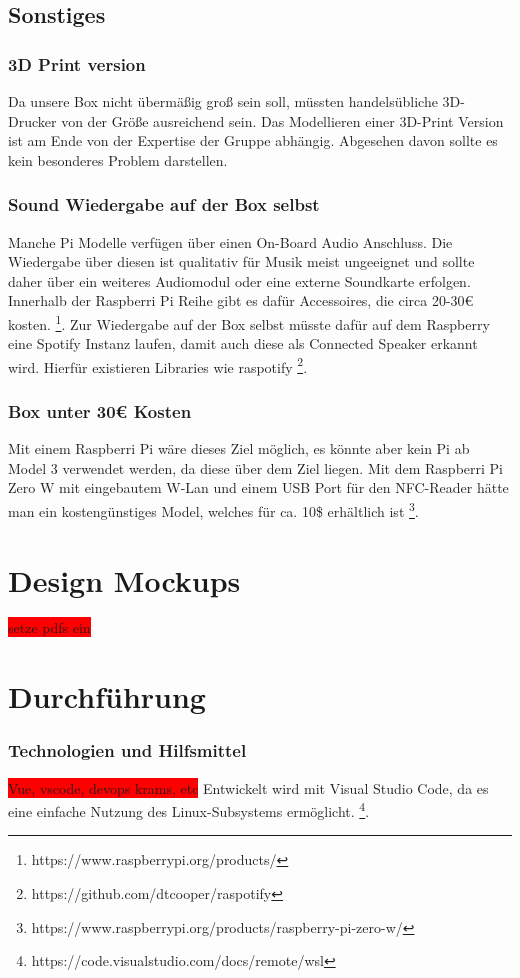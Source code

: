 \documentclass[10pt, a4paper, draft]{article}
\begin{document}
\subsection{Sonstiges}
\subsubsection{3D Print version}
Da unsere Box nicht übermäßig groß sein soll, müssten handelsübliche 3D-Drucker von der Größe ausreichend sein. Das Modellieren einer 3D-Print Version ist am Ende von der Expertise der Gruppe abhängig. Abgesehen davon sollte es kein besonderes Problem darstellen.

\subsubsection{Sound Wiedergabe auf der Box selbst}
Manche Pi Modelle verfügen über einen On-Board Audio Anschluss. Die Wiedergabe über diesen ist qualitativ für Musik meist ungeeignet und sollte daher über ein weiteres Audiomodul oder eine externe Soundkarte erfolgen.  Innerhalb der Raspberri Pi Reihe gibt es dafür Accessoires, die circa 20-30€ kosten. \footnote{https://www.raspberrypi.org/products/}.
Zur Wiedergabe auf der Box selbst müsste dafür auf dem Raspberry eine Spotify Instanz laufen, damit auch diese als Connected Speaker erkannt wird. Hierfür existieren Libraries wie raspotify \footnote{https://github.com/dtcooper/raspotify}.

\subsubsection{Box unter 30€ Kosten}
Mit einem Raspberri Pi wäre dieses Ziel möglich, es könnte aber kein Pi ab Model 3 verwendet werden, da diese über dem Ziel liegen.
Mit dem Raspberri Pi Zero W mit eingebautem W-Lan und einem USB Port für den NFC-Reader hätte man ein kostengünstiges Model, welches für ca. 10\$ erhältlich ist \footnote{https://www.raspberrypi.org/products/raspberry-pi-zero-w/}.

\section{Design Mockups}
\colorbox{red}{setze pdfs ein}

\section{Durchführung}
\subsubsection{Technologien und Hilfsmittel}
\colorbox{red}{Vue, vscode, devops krams, etc}
Entwickelt wird mit Visual Studio Code, da es eine einfache Nutzung des Linux-Subsystems ermöglicht. \footnote{https://code.visualstudio.com/docs/remote/wsl}.
\end{document}
